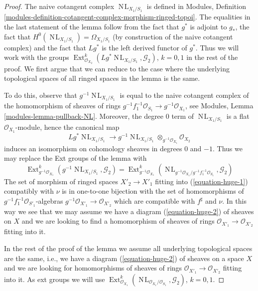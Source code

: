 \documentclass{stacks-project}
\theoremstyle{plain}
\theoremstyle{definition}
\theoremstyle{remark}
\numberwithin{equation}{subsection}
\def\Ext{\mathop{\mathrm{Ext}}\nolimits}
\def\NL{\mathop{N\!L}\nolimits}
\begin{document}
\begin{proof}
The naive cotangent complex $\NL_{X_1/S_1}$ is defined in Modules, Definition
\ref{modules-definition-cotangent-complex-morphism-ringed-topoi}.
The equalities in the last statement of the lemma follow from
the fact that $g^*$ is adjoint to $g_*$, the fact that
$H^0(\NL_{X_1/S_1}) = \Omega_{X_1/S_1}$ (by construction of the
naive cotangent complex) and the fact that $Lg^*$ is the left
derived functor of $g^*$. Thus we will work with the groups
$\Ext^k_{\mathcal{O}_{X_2}}(Lg^*\NL_{X_1/S_1}, \mathcal{G}_2)$,
$k = 0, 1$ in the rest of the proof. We first argue that we can reduce
to the case where the underlying topological spaces of all ringed
spaces in the lemma is the same.

\medskip\noindent
To do this, observe that $g^{-1}\NL_{X_1/S_1}$ is equal to the naive
cotangent complex of the homomorphism of sheaves of rings
$g^{-1}f_1^{-1}\mathcal{O}_{S_1} \to g^{-1}\mathcal{O}_{X_1}$, see
Modules, Lemma \ref{modules-lemma-pullback-NL}.
Moreover, the degree $0$ term of $\NL_{X_1/S_1}$ is a flat
$\mathcal{O}_{X_1}$-module, hence the canonical map
$$
Lg^*\NL_{X_1/S_1}
\longrightarrow
g^{-1}\NL_{X_1/S_1} \otimes_{g^{-1}\mathcal{O}_{X_1}} \mathcal{O}_{X_2}
$$
induces an isomorphism on cohomology sheaves in degrees $0$ and $-1$.
Thus we may replace the Ext groups of the lemma with
$$
\Ext^k_{g^{-1}\mathcal{O}_{X_1}}(g^{-1}\NL_{X_1/S_1}, \mathcal{G}_2) =
\Ext^k_{g^{-1}\mathcal{O}_{X_1}}(
\NL_{g^{-1}\mathcal{O}_{X_1}/g^{-1}f_1^{-1}\mathcal{O}_{S_1}}, \mathcal{G}_2)
$$
The set of morphism of ringed spaces $X'_2 \to X'_1$ fitting into
(\ref{equation-huge-1}) compatibly with $\nu$
is in one-to-one bijection with
the set of homomorphisms of $g^{-1}f_1^{-1}\mathcal{O}_{S'_1}$-algebras
$g^{-1}\mathcal{O}_{X'_1} \to \mathcal{O}_{X'_2}$ which are compatible with
$f^\sharp$ and $\nu$. In this way we see that we may assume we have a
diagram (\ref{equation-huge-2}) of sheaves on $X$ and we are looking to
find a homomorphism of sheaves of rings
$\mathcal{O}_{X'_1} \to \mathcal{O}_{X'_2}$ fitting into it.

\medskip\noindent
In the rest of the proof of the lemma we assume
all underlying topological spaces are the
same, i.e., we have a diagram (\ref{equation-huge-2}) of sheaves on
a space $X$ and we are looking for homomorphisms of sheaves of rings
$\mathcal{O}_{X'_1} \to \mathcal{O}_{X'_2}$ fitting into it.
As ext groups we will use
$\Ext^k_{\mathcal{O}_{X_1}}(
\NL_{\mathcal{O}_{X_1}/\mathcal{O}_{S_1}}, \mathcal{G}_2)$, $k = 0, 1$.


\end{proof}
\end{document}
